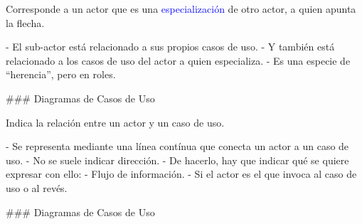 \newline

\columnsbegin


\centering{}

 Corresponde a un actor que es una \textcolor{blue}{especialización} de
otro actor, a quien apunta la flecha.

- El sub-actor está relacionado a sus propios casos de uso.
- Y también está relacionado a los casos de uso del actor a quien especializa.
- Es una especie de ``herencia'', pero en roles.

\columnsend

### Diagramas de Casos de Uso

\newline

\columnsbegin


\vspace{-5mm}
\centering{}

 Indica la relación entre un actor y un caso de uso.\newline

\columnsend

- Se representa mediante una línea contínua que conecta un actor a un caso de uso.
- No se suele indicar dirección.
- De hacerlo, hay que indicar qué se quiere expresar con ello:
    - Flujo de información.
    - Si el actor es el que invoca al caso de uso o al revés.

### Diagramas de Casos de Uso

\newline

\columnsbegin


\centering{}

